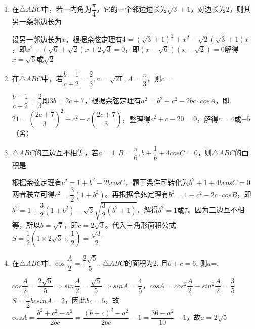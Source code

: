 \begin{enumerate}
\begin{enumerate}
\begin{jieda}
    \end{jieda}
    \item 在$\triangle ABC$中，若一内角为$\dfrac{\pi}{4}$，它的一个邻边边长为$\sqrt{3}+1$，对边长为2，则其另一条邻边长为
    \begin{jieda}
        设另一邻边长为$x$，根据余弦定理有$4 = (\sqrt{3}+1)^2 + x^2 - \sqrt{2}(\sqrt{3}+1)x$，即$x^2-(\sqrt{6}+\sqrt{2})x + 2\sqrt{3} = 0$，即$(x - \sqrt{6}) (x-\sqrt{2}) = 0$解得$x = \sqrt{6} \mbox{或}\sqrt{2}$
    \end{jieda}
    \item 在$\triangle ABC$中，若$\dfrac{b-1}{c+2} = \dfrac{2}{3}, a = \sqrt{21}, A = \dfrac{\pi}{3}$，则$c = $
    \begin{jieda}
        $\dfrac{b-1}{c+2} = \dfrac{2}{3}$即$3b = 2c + 7$，根据余弦定理有$a^2 = b^2+c^2 - 2bc \cdot cosA$，即$21 = \left(\dfrac{2c+7}{3}\right)^2 + c^2 - c\left(\dfrac{2c+7}{3}\right)$，整理得$c^2 + c - 20 = 0$，解得$c = 4$或$-5$（舍）
    \end{jieda}
    \item $\triangle ABC$的三边互不相等，若$a = 1, B = \dfrac{\pi}{6}, b + \dfrac{1}{b} + 4cosC = 0$，则$\triangle ABC$的面积是 
    \begin{jieda}
        根据余弦定理有$c^2 = 1 + b^2 - 2bcosC$，题干条件可转化为$b^2 + 1 + 4bcosC = 0$两者联立可得$c^2 = \dfrac{3}{2}(1+b^2)$。再根据余弦定理有$b^2 = 1 + c^2 - 2c \cdot cosB$，即$b^2 = 1 + \dfrac{3}{2}(1+b^2) - \sqrt{3}\sqrt{\dfrac{3}{2}(b^2+1)}$，解得$b^2 = 1 \mbox{或} 7$。因为三边互不相等，所以$b = \sqrt{7}$，即$c = 2\sqrt{3}$。代入三角形面积公式$S = \dfrac{1}{2}(1 \times 2\sqrt{3} \times \dfrac{1}{2}) = \dfrac{\sqrt{3}}{2}$
    \end{jieda}
    \item 在$\triangle{ABC}$中, $\cos\dfrac{A}{2}=\dfrac{2\sqrt{5}}{5}$, $\triangle{ABC}$的面积为2, 且$b+c=6$, 则$a$=. 
    \begin{jieda}
        $cos\dfrac{A}{2} = \dfrac{2\sqrt{5}}{5} \Longrightarrow sin\dfrac{A}{2} = \dfrac{\sqrt{5}}{5} \Longrightarrow sinA = \dfrac{4}{5}$，$cosA = cos^2\dfrac{A}{2} - sin^2\dfrac{A}{2} = \dfrac{3}{5}$ \\
        $S = \dfrac{1}{2}bcsinA = 2$，因此$bc = 5$，故$cosA = \dfrac{b^2+c^2-a^2}{2bc} = \dfrac{(b+c)^2-a^2}{2bc} - 1 = \dfrac{36-a^2}{10} - 1$，故$a = 2\sqrt{5}$
    \end{jieda}

\end{enumerate}
\end{enumerate}
